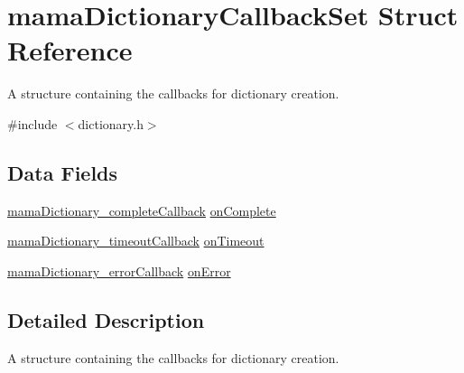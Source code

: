 \hypertarget{structmamaDictionaryCallbackSet}{
\section{mamaDictionaryCallbackSet Struct Reference}
\label{structmamaDictionaryCallbackSet}
}


A structure containing the callbacks for dictionary creation.  


{\ttfamily \#include $<$dictionary.h$>$}\subsection*{Data Fields}
\begin{DoxyCompactItemize}
\item 
\hyperlink{dictionary_8h_a8d14df7d621248fc3601fc47abf818f4}{mamaDictionary\_\-completeCallback} \hyperlink{structmamaDictionaryCallbackSet_ade53def51e34834d4d59741d79e41e2c}{onComplete}
\item 
\hyperlink{dictionary_8h_a1eba76a140a63bc91b5d7d4d6267d617}{mamaDictionary\_\-timeoutCallback} \hyperlink{structmamaDictionaryCallbackSet_ab10d87dc6a389627b817725912a8135c}{onTimeout}
\item 
\hyperlink{dictionary_8h_aed64328afb7bffa7288bf67e7575f9b2}{mamaDictionary\_\-errorCallback} \hyperlink{structmamaDictionaryCallbackSet_a113ba41da95e48e669426513209e4994}{onError}
\end{DoxyCompactItemize}


\subsection{Detailed Description}
A structure containing the callbacks for dictionary creation. 


